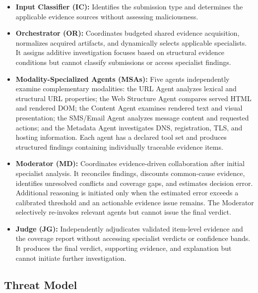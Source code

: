 \begin{itemize}

\item \textbf{Input Classifier (IC):}
Identifies the submission type and determines
the applicable evidence sources without
assessing maliciousness.

\item \textbf{Orchestrator (OR):}
Coordinates budgeted shared evidence acquisition,
normalizes acquired artifacts, and dynamically
selects applicable specialists. It assigns
additive investigation focuses based on
structural evidence conditions but cannot
classify submissions or access specialist
findings.

\item \textbf{Modality-Specialized Agents (MSAs):}
Five agents independently examine complementary
modalities: the URL Agent analyzes lexical
and structural URL properties; the Web Structure
Agent compares served HTML and rendered DOM;
the Content Agent examines rendered text and
visual presentation; the SMS/Email Agent
analyzes message content and requested actions;
and the Metadata Agent investigates DNS,
registration, TLS, and hosting information.
Each agent has a declared tool set and produces
structured findings containing individually
traceable evidence items.

\item \textbf{Moderator (MD):}
Coordinates evidence-driven collaboration
after initial specialist analysis. It reconciles
findings, discounts common-cause evidence,
identifies unresolved conflicts and coverage
gaps, and estimates decision error. Additional
reasoning is initiated only when the estimated
error exceeds a calibrated threshold and an
actionable evidence issue remains. The Moderator
selectively re-invokes relevant agents but
cannot issue the final verdict.

\item \textbf{Judge (JG):}
Independently adjudicates validated item-level
evidence and the coverage report without
accessing specialist verdicts or confidence
bands. It produces the final verdict, supporting
evidence, and explanation but cannot initiate
further investigation.

\end{itemize}


\subsection{Threat Model}
\label{sec:threat}

